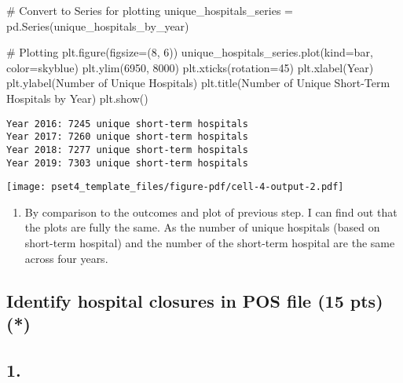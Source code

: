 \documentclass[
  letterpaper,
  DIV=11,
  numbers=noendperiod]{scrartcl}
\newenvironment{Shaded}{\begin{snugshade}}{\end{snugshade}}
\newcommand{\CommentTok}[1]{\textcolor[rgb]{0.37,0.37,0.37}{#1}}
\newcommand{\DecValTok}[1]{\textcolor[rgb]{0.68,0.00,0.00}{#1}}
\newcommand{\NormalTok}[1]{\textcolor[rgb]{0.00,0.23,0.31}{#1}}
\newcommand{\OperatorTok}[1]{\textcolor[rgb]{0.37,0.37,0.37}{#1}}
\newcommand{\StringTok}[1]{\textcolor[rgb]{0.13,0.47,0.30}{#1}}
\providecommand{\tightlist}{%
  \setlength{\itemsep}{0pt}\setlength{\parskip}{0pt}}\usepackage{longtable,booktabs,array}
\begin{document}
\begin{Shaded}
\begin{Highlighting}[]
\CommentTok{\# Convert to Series for plotting}
\NormalTok{unique\_hospitals\_series }\OperatorTok{=}\NormalTok{ pd.Series(unique\_hospitals\_by\_year)}

\CommentTok{\# Plotting}
\NormalTok{plt.figure(figsize}\OperatorTok{=}\NormalTok{(}\DecValTok{8}\NormalTok{, }\DecValTok{6}\NormalTok{))}
\NormalTok{unique\_hospitals\_series.plot(kind}\OperatorTok{=}\StringTok{\textquotesingle{}bar\textquotesingle{}}\NormalTok{, color}\OperatorTok{=}\StringTok{\textquotesingle{}skyblue\textquotesingle{}}\NormalTok{)}
\NormalTok{plt.ylim(}\DecValTok{6950}\NormalTok{, }\DecValTok{8000}\NormalTok{)  }
\NormalTok{plt.xticks(rotation}\OperatorTok{=}\DecValTok{45}\NormalTok{)}
\NormalTok{plt.xlabel(}\StringTok{\textquotesingle{}Year\textquotesingle{}}\NormalTok{)}
\NormalTok{plt.ylabel(}\StringTok{\textquotesingle{}Number of Unique Hospitals\textquotesingle{}}\NormalTok{)}
\NormalTok{plt.title(}\StringTok{\textquotesingle{}Number of Unique Short{-}Term Hospitals by Year\textquotesingle{}}\NormalTok{)}
\NormalTok{plt.show()}
\end{Highlighting}
\end{Shaded}

\begin{verbatim}
Year 2016: 7245 unique short-term hospitals
Year 2017: 7260 unique short-term hospitals
Year 2018: 7277 unique short-term hospitals
Year 2019: 7303 unique short-term hospitals
\end{verbatim}

\texttt{[image: pset4\_template\_files/figure-pdf/cell-4-output-2.pdf]}

\begin{enumerate}
\def\labelenumi{\alph{enumi}.}
\setcounter{enumi}{1}
\tightlist
\item
  By comparison to the outcomes and plot of previous step. I can find
  out that the plots are fully the same. As the number of unique
  hospitals (based on short-term hospital) and the number of the
  short-term hospital are the same across four years.
\end{enumerate}

\subsection{Identify hospital closures in POS file (15 pts)
(*)}\label{identify-hospital-closures-in-pos-file-15-pts}

\subsection{1.}\label{section}
\end{document}
